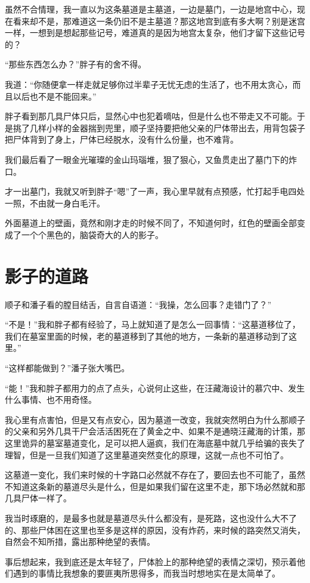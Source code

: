 虽然不合情理，我一直以为这条墓道是主墓道，一边是墓门，一边是地宫中心，现在看来却不是，那难道这一条仍旧不是主墓道？那这地宫到底有多大啊？别是迷宫一样，一想到是想起那些记号，难道真的是因为地宫太复杂，他们才留下这些记号的？

“那些东西怎么办？”胖子有的舍不得。

我道：“你随便拿一样走就足够你过半辈子无忧无虑的生活了，也不用太贪心，而且以后也不是不能回来。”

胖子看到那几具尸体只后，显然心中也犯着嘀咕，但是什么也不带走又不可能。于是挑了几样小样的金器揣到兜里，顺子坚持要把他父亲的尸体带出去，用背包袋子把尸体背到了身上，尸体已经脱水，没有什么份量，也不难背。

我们最后看了一眼金光璀璨的金山玛瑙堆，狠了狠心，又鱼贯走出了墓门下的炸口。

才一出墓门，我就又听到胖子“嗯”了一声，我心里早就有点预感，忙打起手电四处一照，不由就一身白毛汗。

外面墓道上的壁画，竟然和刚才走的时候不同了，不知道何时，红色的壁画全部变成了一个个黑色的，脑袋奇大的人的影子。

\chapter{影子的道路}

顺子和潘子看的膛目结舌，自言自语道：“我操，怎么回事？走错门了？”

“不是！”我和胖子都有经验了，马上就知道了是怎么一回事情：“这墓道移位了，我们在墓室里面的时候，老的墓道移到了其他的地方，一条新的墓道移动到了这里。”

“这样都能做到？”潘子张大嘴巴。

“能！”我和胖子都用力的点了点头，心说何止这些，在汪藏海设计的慕穴中、发生什么事情、也不用奇怪。

我心里有点害怕，但是又有点安心，因为墓道一改变，我就突然明白为什么那顺子的父亲和另外几具干尸会活活困死在了黄金之中、如果不是通晓汪藏海的计策，那这里诡异的墓室墓道变化，足可以把人逼疯，我们在海底墓中就几乎给骗的丧失了理智，但是一旦我们知道了这里墓道突然变化的原理，这就一点也不可怕了。

这墓道一变化，我们来时候的十字路口必然就不存在了，要回去也不可能了，虽然不知道这条新的墓道尽头是什么，但是如果我们留在这里不走，那下场必然就和那几具尸体一样了。

我当时琢磨的，是最多也就是墓道尽头什么都没有，是死路，这也没什么大不了的、那些尸体困在这里也至多是这样的原因，没有炸药，来时候的路突然又消失，自然会不知所措，露出那种绝望的表情。

事后想起来，我到底还是太年轻了，尸体脸上的那种绝望的表情之深切，预示着他们遇到的事情比我想象的要匪夷所思得多，而我当时想地实在是太简单了。

